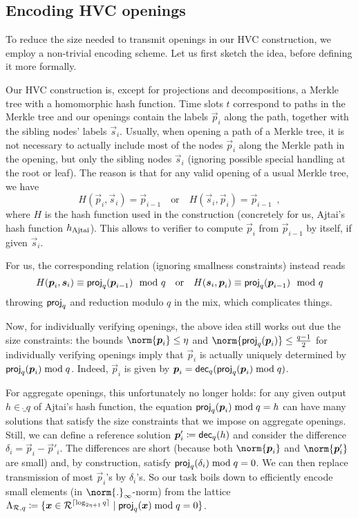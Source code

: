 \subsection{Encoding HVC openings}\label{sect:efficientencoding}

To reduce the size needed to transmit openings in our HVC construction, we employ a non-trivial encoding scheme.
Let us first sketch the idea, before defining it more formally.

Our HVC construction is, except for projections and decompositions, a Merkle tree with a homomorphic hash function.
Time slots $t$ correspond to paths in the Merkle tree and our openings contain the labels $\vec{p}_i$ along the path, together with the sibling nodes' labels $\vec{s}_i$.
Usually, when opening a path of a Merkle tree, it is not necessary to actually include most of the nodes $\vec{p}_i$ along the Merkle path in the opening, but only the sibling nodes $\vec{s}_i$ (ignoring possible special handling at the root or leaf).
The reason is that for any valid opening of a usual Merkle tree, we have 
\[
 H(\vec{p}_i,\vec{s}_i) = \vec{p}_{i-1} \quad\text{or}\quad H(\vec{s}_i,\vec{p}_i) = \vec{p}_{i-1}\enspace, 
\]
where $H$ is the hash function used in the construction (concretely for us, Ajtai's hash function $h_\mathrm{Ajtai}$).
This allows to verifier to compute $\vec{p}_i$ from $\vec{p}_{i-1}$ by itself, if given $\vec{s}_i$.

For us, the corresponding relation (ignoring smallness constraints) instead reads
\[
 H(\boldsymbol{p}_i,\boldsymbol{s}_i) \equiv \mathsf{proj}_q(\boldsymbol{p}_{i-1})\mod q  \quad\text{or}\quad H(\boldsymbol{s}_i,\boldsymbol{p}_i) \equiv \mathsf{proj}_q(\boldsymbol{p}_{i-1})\mod q
\]
throwing $\mathsf{proj}_q$ and reduction modulo $q$ in the mix, which complicates things.

Now, for individually verifying openings, the above idea still works out due the size constraints:
the bounds $\norm{\vec{p}_i} \leq \eta$ and $\norm{\proj_q(\vec{p}_i)}\leq \tfrac{q-1}{2}$ for individually verifying openings imply that $\vec{p}_i$ is actually uniquely determined by $\mathsf{proj}_q(\boldsymbol{p}_i)\bmod q$.
Indeed, $\vec{p}_i$ is given by $\boldsymbol{p}_i = \mathsf{dec}_q(\mathsf{proj}_q(\boldsymbol{p}_i)\bmod q)$.

For aggregate openings, this unfortunately no longer holds:
for any given output $h\in\ring_q$ of Ajtai's hash function, the equation $\mathsf{proj}_q(\boldsymbol{p}_i)\bmod q = h$ can have many solutions
that satisfy the size constraints that we impose on aggregate openings.
Still, we can define a reference solution $\boldsymbol{p}_i' \coloneqq \mathsf{dec}_q(h)$ and consider the difference $\delta_i = \vec{p}_i - \vec{p}'_i$.
The differences are short (because both $\norm{\vec{p}_i}$ and $\norm{\vec{p}'_i}$ are small) and, by construction, satisfy $\mathsf{proj}_q(\delta_i) \bmod q = 0$.
We can then replace transmission of most $\vec{p}_i$'s by $\delta_i$'s.
So our task boils down to efficiently encode small elements (in $\norm{.}_{\infty}$-norm) from the lattice $\Lambda_{\mathcal{R},q} \coloneqq \{\boldsymbol{x}\in\mathcal{R}^{\lceil\log_{2\eta+1}q\rceil}\mid \mathsf{proj}_q(\boldsymbol{x})\bmod q = 0\}$.

